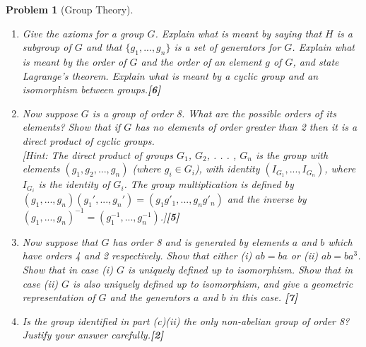 \documentclass[a4paper]{article}
\theoremstyle{new}
\newtheorem{qns}{Problem}[section]
\begin{document}
\begin{qns}[Group Theory]\leavevmode
\begin{enumerate}[label=(\alph*)]
\item Give the axioms for a group $G$. Explain what is meant by saying that $H$ is a subgroup of $G$ and that $\{g_1, . . . , g_n\}$ is a set of generators for $G$. Explain what is meant by the order of $G$ and the order of an element $g$ of $G$, and state Lagrange’s theorem. Explain what is meant by a cyclic group and an isomorphism between groups.\hfill\textbf{[6]}
\item Now suppose $G$ is a group of order 8. What are the possible orders of its elements? Show that if $G$ has no elements of order greater than 2 then it is a direct product of cyclic groups.\\[5pt] [Hint: The direct product of groups $G_1$, $G_2$, . . . , $G_n$ is the group with elements $(g_1, g_2, . . . , g_n)$ (where $g_i\in G_i$), with identity $(I_{G_1} , . . . , I_{G_n})$, where $I_{G_i}$ is the identity of $G_i$. The group multiplication is defined by $(g_1, . . . , g_n)(g_1', . . . , g_n') = (g_1g'_1, . . . , g_ng'_n)$ and the inverse by $(g_1, . . . , g_n)^{−1} = (g^{−1}_1 , . . . , g^{−1}_n )$.]\hfill\textbf{[5]}
\item Now suppose that $G$ has order 8 and is generated by elements $a$ and $b$ which have orders 4 and 2 respectively. Show that either (i) $ab = ba$ or (ii) $ab = ba^3$. Show that in case (i) $G$ is uniquely defined up to isomorphism. Show that in case (ii) $G$ is also uniquely defined up to isomorphism, and give a geometric representation of $G$ and the generators $a$ and $b$ in this case. \hfill\textbf{[7]}
\item Is the group identified in part (c)(ii) the only non-abelian group of order 8? Justify your answer carefully.\hfill\textbf{[2]}
\end{enumerate}
\end{qns}
\end{document}
